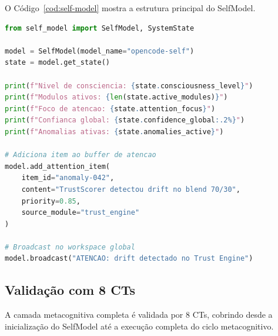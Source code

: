 O Código~\ref{cod:self-model} mostra a estrutura principal do SelfModel.

\begin{lstlisting}[caption={Arquitetura do SelfModel: atencao, workspace
global e introspeccao.},
label={cod:self-model}, style=pythonstyle, language=Python]
from self_model import SelfModel, SystemState

model = SelfModel(model_name="opencode-self")
state = model.get_state()

print(f"Nivel de consciencia: {state.consciousness_level}")
print(f"Modulos ativos: {len(state.active_modules)}")
print(f"Foco de atencao: {state.attention_focus}")
print(f"Confianca global: {state.confidence_global:.2%}")
print(f"Anomalias ativas: {state.anomalies_active}")

# Adiciona item ao buffer de atencao
model.add_attention_item(
    item_id="anomaly-042",
    content="TrustScorer detectou drift no blend 70/30",
    priority=0.85,
    source_module="trust_engine"
)

# Broadcast no workspace global
model.broadcast("ATENCAO: drift detectado no Trust Engine")
\end{lstlisting}

\subsection{Validação com 8 CTs}

A camada metacognitiva completa é validada por 8 CTs, cobrindo desde a
inicialização do SelfModel até a execução completa do ciclo metacognitivo.

\begin{table}[htb]
\centering
    \small
\caption{Casos de Teste da camada metacognitiva}
\label{tab:cts-metacognicao}
\end{table}

